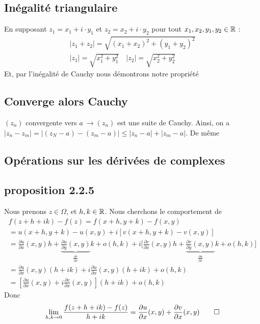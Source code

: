 \documentclass[12pt,a4paper]{article}
\newcommand{\zn}{\ensuremath{(z_n)} }
\begin{document}
\subsection{Inégalité triangulaire}
\label{app_preuve: inegalite triangulaire}
En supposant $ z_1 = x_1 + i\cdot y_1$ et $z_2 = x_2 + i \cdot y_2$ pour tout $x_1,x_2,y_1,y_2 \in \mathbb{R}$ :
\begin{align}
	|z_1 + z_2| = \sqrt{(x_1+x_2)^2 + (y_1+y_2)^2}\\
	|z_1| = \sqrt{x_1^2 + y_1^2} \quad |z_2| = \sqrt{x_2^2 + y_2^2}
\end{align}
Et, par l'inégalité de Cauchy nous démontrons notre propriété

\subsection{Converge alors Cauchy}
\label{app_preuve: converge cauchy}
\zn convergente vers $a\ \to \zn$ est une suite de Cauchy. Ainsi, on a $|z_n-z_m| = |(z_N-a) - (z_m-a)| \leq |z_n-a| + |z_m - a|$. De même 

\subsection{Opérations sur les dérivées de complexes}
\label{app_preuve: operations derivee complexe}

\subsection{proposition 2.2.5}
\label{app_preuve: proposition 2.2.5}
Nous prenons $z \in \Omega$, et $h,k \in \mathbb{R}$. Nous cherchons le comportement de 
\begin{align*}
    f(z+h+ik) - f(z) = f(x+h, y+k) - f(x,y) \\
    = u(x+h, y+k) - u(x,y) + i[v(x+h, y+k) - v(x,y)]\\
    = \frac{\partial u}{\partial x}(x,y) h + \underbrace{\frac{\partial u}{\partial y}(x,y)}_{\frac{\partial v}{\partial x}} k + o(h,k) + i\Big[\frac{\partial v}{\partial x}(x,y) h + \underbrace{\frac{\partial v}{\partial y}(x,y)}_{\frac{\partial u}{\partial x}}k + o(h,k)\Big]\\
    = \frac{\partial u}{\partial x}(x,y) (h+ik) + i\frac{\partial u}{\partial x}(x,y)(h+ik) + o(h,k)\\
    = \left[\frac{\partial u}{\partial x}(x,y) + i\frac{\partial v}{\partial x}(x,y)\right](h+ik) + o(h,k)
\end{align*}
Donc 
\[\lim\limits_{h,k \to 0} \frac{f(z+h+ik) - f(z)}{h+ik} = \frac{\partial u}{\partial x}(x,y) +  \frac{\partial v}{\partial x}(x,y) \qed\]
\end{document}
